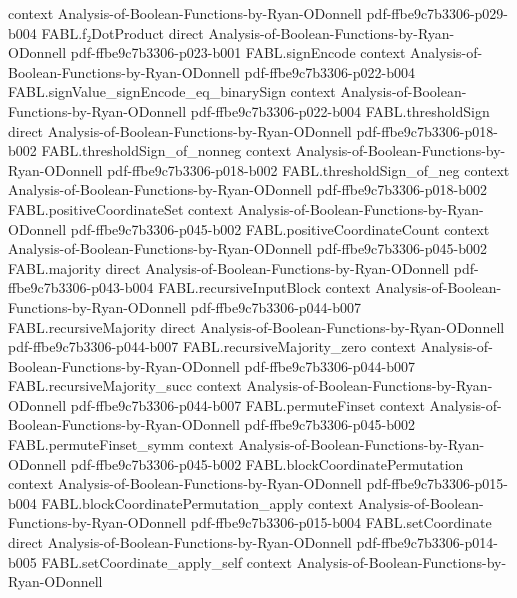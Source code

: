 \begin{theorem}
  {context}
  {Analysis-of-Boolean-Functions-by-Ryan-ODonnell}
  {pdf-ffbe9c7b3306-p029-b004}
\proofstep
  {FABL.f₂DotProduct}
  {direct}
  {Analysis-of-Boolean-Functions-by-Ryan-ODonnell}
  {pdf-ffbe9c7b3306-p023-b001}
\proofstep
  {FABL.signEncode}
  {context}
  {Analysis-of-Boolean-Functions-by-Ryan-ODonnell}
  {pdf-ffbe9c7b3306-p022-b004}
\proofstep
  {FABL.signValue_signEncode_eq_binarySign}
  {context}
  {Analysis-of-Boolean-Functions-by-Ryan-ODonnell}
  {pdf-ffbe9c7b3306-p022-b004}
\proofstep
  {FABL.thresholdSign}
  {direct}
  {Analysis-of-Boolean-Functions-by-Ryan-ODonnell}
  {pdf-ffbe9c7b3306-p018-b002}
\proofstep
  {FABL.thresholdSign_of_nonneg}
  {context}
  {Analysis-of-Boolean-Functions-by-Ryan-ODonnell}
  {pdf-ffbe9c7b3306-p018-b002}
\proofstep
  {FABL.thresholdSign_of_neg}
  {context}
  {Analysis-of-Boolean-Functions-by-Ryan-ODonnell}
  {pdf-ffbe9c7b3306-p018-b002}
\proofstep
  {FABL.positiveCoordinateSet}
  {context}
  {Analysis-of-Boolean-Functions-by-Ryan-ODonnell}
  {pdf-ffbe9c7b3306-p045-b002}
\proofstep
  {FABL.positiveCoordinateCount}
  {context}
  {Analysis-of-Boolean-Functions-by-Ryan-ODonnell}
  {pdf-ffbe9c7b3306-p045-b002}
\proofstep
  {FABL.majority}
  {direct}
  {Analysis-of-Boolean-Functions-by-Ryan-ODonnell}
  {pdf-ffbe9c7b3306-p043-b004}
\proofstep
  {FABL.recursiveInputBlock}
  {context}
  {Analysis-of-Boolean-Functions-by-Ryan-ODonnell}
  {pdf-ffbe9c7b3306-p044-b007}
\proofstep
  {FABL.recursiveMajority}
  {direct}
  {Analysis-of-Boolean-Functions-by-Ryan-ODonnell}
  {pdf-ffbe9c7b3306-p044-b007}
\proofstep
  {FABL.recursiveMajority_zero}
  {context}
  {Analysis-of-Boolean-Functions-by-Ryan-ODonnell}
  {pdf-ffbe9c7b3306-p044-b007}
\proofstep
  {FABL.recursiveMajority_succ}
  {context}
  {Analysis-of-Boolean-Functions-by-Ryan-ODonnell}
  {pdf-ffbe9c7b3306-p044-b007}
\proofstep
  {FABL.permuteFinset}
  {context}
  {Analysis-of-Boolean-Functions-by-Ryan-ODonnell}
  {pdf-ffbe9c7b3306-p045-b002}
\proofstep
  {FABL.permuteFinset_symm}
  {context}
  {Analysis-of-Boolean-Functions-by-Ryan-ODonnell}
  {pdf-ffbe9c7b3306-p045-b002}
\proofstep
  {FABL.blockCoordinatePermutation}
  {context}
  {Analysis-of-Boolean-Functions-by-Ryan-ODonnell}
  {pdf-ffbe9c7b3306-p015-b004}
\proofstep
  {FABL.blockCoordinatePermutation_apply}
  {context}
  {Analysis-of-Boolean-Functions-by-Ryan-ODonnell}
  {pdf-ffbe9c7b3306-p015-b004}
\proofstep
  {FABL.setCoordinate}
  {direct}
  {Analysis-of-Boolean-Functions-by-Ryan-ODonnell}
  {pdf-ffbe9c7b3306-p014-b005}
\proofstep
  {FABL.setCoordinate_apply_self}
  {context}
  {Analysis-of-Boolean-Functions-by-Ryan-ODonnell}

\end{theorem}
